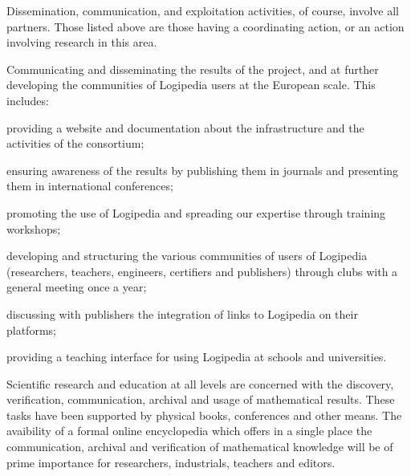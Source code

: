 \begin{workpackage}[id=dissemination,type=MGT,wphases=1-48,
  short={Dissemination},
  title={Dissemination, communication and exploitation},
  lead=Lie,LieRM=1,InrRM=6,BirRM=4,CleRM=2,ImtRM=2,StrRM=2,ZibRM=14,EduRM=12]

  Dissemination, communication, and exploitation activities, of course,
  involve all partners. Those listed above are those having a coordinating
  action, or an action involving research in this area.

  \begin{wpobjectives}
    Communicating and disseminating the
    results of the project, and at further developing the communities
    of Logipedia users at the European scale. This includes:
    \begin{compactitem}
    \item providing a website and documentation about the
      infrastructure and the activities of the consortium;
    \item ensuring awareness of the results by publishing them in
      journals and presenting them in international conferences;
    \item promoting the use of Logipedia and spreading our expertise
      through training workshops;
    \item developing and structuring the various communities of users
      of Logipedia (researchers, teachers, engineers, certifiers and
      publishers) through clubs with a general meeting once a year;
    \item discussing with publishers the integration of links to
      Logipedia on their platforms;
    \item providing a teaching interface for using Logipedia at
      schools and universities.
    \end{compactitem}

    Scientific research and education at all levels are concerned with
    the discovery, verification, communication, archival and usage of
    mathematical results. These tasks have been supported by physical
    books, conferences and other means. The avaibility of a formal
    online encyclopedia which offers in a single place the
    communication, archival and verification of mathematical knowledge
    will be of prime importance for researchers, industrials, teachers
    and editors.

  \end{wpobjectives}



\end{workpackage}
